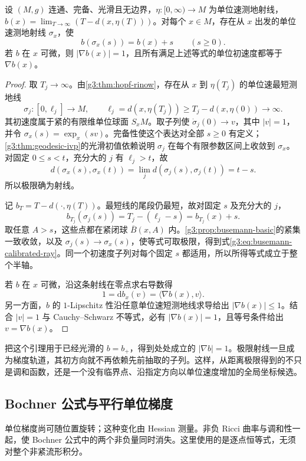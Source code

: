 \begin{lemma}\label{g3:lem:busemann-calibrated-ray}
	设 \((M,g)\) 连通、完备、光滑且无边界，\(\eta:[0,\infty)\to M\) 为单位速测地射线，\(b(x)=\lim_{T\to\infty}(T-d(x,\eta(T)))\)。对每个 \(x\in M\)，存在从 \(x\) 出发的单位速测地射线 \(\sigma_x\)，使
	\begin{equation}\label{g3:eq:busemann-calibrated-ray}
		b(\sigma_x(s))=b(x)+s\qquad(s\ge0).
	\end{equation}
	若 \(b\) 在 \(x\) 可微，则 \(|\nabla b(x)|=1\)，且所有满足上述等式的单位初速度都等于 \(\nabla b(x)\)。
\end{lemma}
\begin{proof}
	取 \(T_j\to\infty\)。由\cref{g3:thm:hopf-rinow}，存在从 \(x\) 到 \(\eta(T_j)\) 的单位速最短测地线
	\[
		\sigma_j:[0,\ell_j]\to M,\qquad
		\ell_j=d(x,\eta(T_j))\ge T_j-d(x,\eta(0))\longrightarrow\infty.
	\]
	其初速度属于紧的有限维单位球面 \(S_xM\)。取子列使 \(\dot\sigma_j(0)\to v\)，其中 \(|v|=1\)，并令 \(\sigma_x(s)=\exp_x(sv)\)。完备性使这个表达对全部 \(s\ge0\) 有定义；\cref{g3:thm:geodesic-ivp}的光滑初值依赖说明 \(\sigma_j\) 在每个有限参数区间上收敛到 \(\sigma_x\)。对固定 \(0\le s<t\)，充分大的 \(j\) 有 \(\ell_j>t\)，故
	\[
		d(\sigma_x(s),\sigma_x(t))
		=\lim_jd(\sigma_j(s),\sigma_j(t))=t-s.
	\]
	所以极限确为射线。

	记 \(b_T=T-d(\cdot,\eta(T))\)。最短线的尾段仍最短，故对固定 \(s\) 及充分大的 \(j\)，
	\[
		b_{T_j}(\sigma_j(s))
		=T_j-(\ell_j-s)=b_{T_j}(x)+s.
	\]
	取任意 \(A>s\)，这些点都在紧闭球 \(\overline B(x,A)\) 内。\cref{g3:prop:busemann-basic}的紧集一致收敛，以及 \(\sigma_j(s)\to\sigma_x(s)\)，使等式可取极限，得到式\eqref{g3:eq:busemann-calibrated-ray}。同一个初速度子列对每个固定 \(s\) 都适用，所以所得等式成立于整个半轴。

	若 \(b\) 在 \(x\) 可微，沿这条射线在零点求右导数得
	\[
		1=\mathrm db_x(v)=\langle\nabla b(x),v\rangle.
	\]
	另一方面，\(b\) 的 \(1\)-Lipschitz 性沿任意单位速短测地线求导给出 \(|\nabla b(x)|\le1\)。结合 \(|v|=1\) 与 Cauchy--Schwarz 不等式，必有 \(|\nabla b(x)|=1\)，且等号条件给出 \(v=\nabla b(x)\)。
\end{proof}

把这个引理用于已经光滑的 \(b=b_+\)，得到处处成立的 \(|\nabla b|=1\)。极限射线一旦成为梯度轨道，其初方向就不再依赖先前抽取的子列。这样，从距离极限得到的不只是调和函数，还是一个没有临界点、沿指定方向以单位速度增加的全局坐标候选。

\subsection{Bochner 公式与平行单位梯度}
\label{g3:subsec:1505:04}
单位梯度尚可随位置旋转；这种变化由 Hessian 测量。非负 Ricci 曲率与调和性一起，使 Bochner 公式中的两个非负量同时消失。这里使用的是逐点恒等式，无须对整个非紧流形积分。


